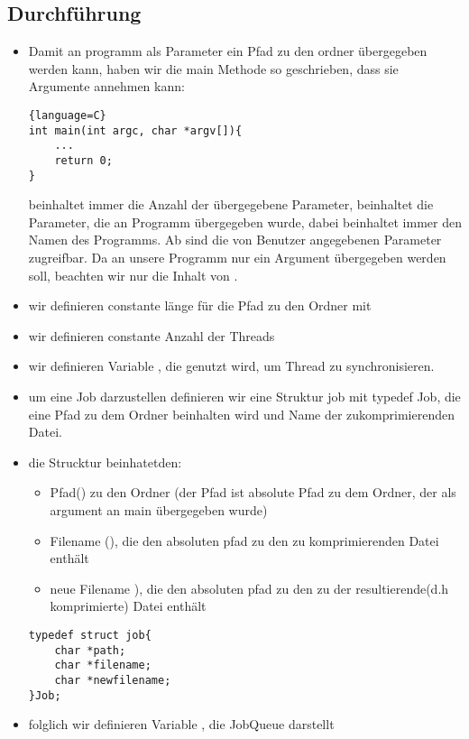 	\subsection{Durchführung}
\begin{itemize}
	\item Damit an programm als Parameter ein Pfad zu den ordner übergegeben werden kann, haben wir die main
	Methode so geschrieben, dass sie Argumente annehmen kann:
\begin{lstlisting}{language=C}
int main(int argc, char *argv[]){
	...
	return 0;
}
\end{lstlisting}
	 beinhaltet immer die Anzahl der übergegebene Parameter,
	 beinhaltet die Parameter, die an Programm übergegeben wurde,
	dabei  beinhaltet immer den Namen des Programms.
	Ab  sind die von Benutzer angegebenen Parameter zugreifbar.
	Da an unsere Programm nur ein Argument übergegeben werden soll,
	beachten wir nur die Inhalt von .
	\item wir definieren constante länge für die Pfad zu den Ordner mit 
	\item wir definieren constante Anzahl der Threads 
	\item wir definieren Variable , die genutzt wird,
	um Thread zu synchronisieren.
	\item um eine Job darzustellen definieren wir eine Struktur job mit typedef Job,
	die eine Pfad zu dem Ordner beinhalten wird und Name der zukomprimierenden Datei.
	\item die Strucktur beinhatetden:
	\begin{itemize}
		\item Pfad() zu den Ordner (der Pfad ist absolute Pfad zu dem Ordner, der als argument an main
	übergegeben wurde)
	\item Filename (), die den absoluten pfad zu den zu komprimierenden Datei enthält
	\item neue Filename ), die den absoluten pfad zu den zu der resultierende(d.h komprimierte) Datei enthält
\end{itemize}
\begin{lstlisting}
typedef struct job{
	char *path;
	char *filename;
	char *newfilename;
}Job;
\end{lstlisting}
	\item folglich wir definieren Variable , die JobQueue darstellt

\end{itemize}
